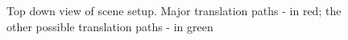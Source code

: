 \begin{figure}

	
	\caption{Top down view of scene setup. Major translation paths - in red; the other possible translation paths - in green}
	\label{fig:pilot1translationpaths}
\end{figure}


